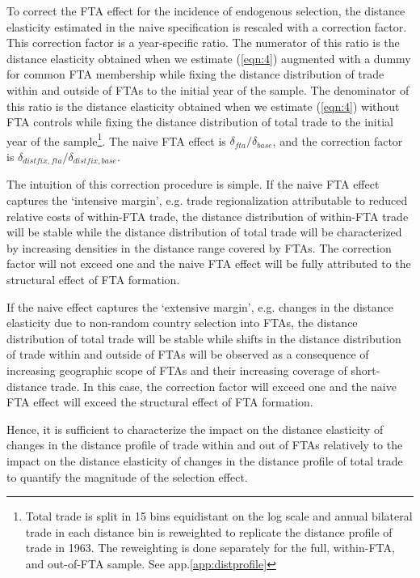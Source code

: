 \documentclass[12pt,twoside,a4paper,notitlepage]{article}
\begin{document}
To correct the FTA effect for the incidence of endogenous selection, the distance elasticity estimated in the naive  specification is rescaled with a correction factor.
This correction factor is a year-specific ratio.
The numerator of this ratio is the distance elasticity obtained when we estimate (\ref{eqn:4}) augmented with a dummy for common FTA membership while fixing the distance distribution of trade within and outside of FTAs to the initial year of the sample.
The denominator of this ratio is the distance elasticity obtained when we estimate (\ref{eqn:4}) without FTA controls while fixing the distance distribution of total trade to the initial year of the sample\footnote{Total trade is split in 15 bins equidistant on the log scale and annual bilateral trade in each distance bin is reweighted to replicate the distance profile of trade in 1963.
The reweighting is done separately for the full, within-FTA, and out-of-FTA sample.
See app.\ref{app:distprofile}}.
The naive FTA effect is $\delta_{fta}/\delta_{base}$, and the correction factor is $\delta_{distfix,fta}/\delta_{distfix,base}$.


The intuition of this correction procedure is simple.
If the naive FTA effect captures the `intensive margin', e.g.
trade regionalization attributable to reduced relative costs of within-FTA trade, the distance distribution of within-FTA trade will be stable while the distance distribution of total trade will be characterized by increasing densities in the distance range covered by FTAs.
The correction factor will not exceed one and the naive FTA effect will be fully attributed to the structural effect of FTA formation.

If the naive effect captures the `extensive margin', e.g.
changes in the distance elasticity due to non-random country selection into FTAs, the distance distribution of total trade will be stable while shifts in the distance distribution of trade within and outside of FTAs will be observed as a consequence of increasing geographic scope of FTAs and their increasing coverage of short-distance trade.
In this case, the correction factor will exceed one and the naive FTA effect will exceed the structural effect of FTA formation.


Hence, it is sufficient to characterize the impact on the distance elasticity of changes in the distance profile of trade within and out of FTAs relatively to the impact on the distance elasticity of changes in the distance profile of total trade to quantify the magnitude of the selection effect.
\end{document}
